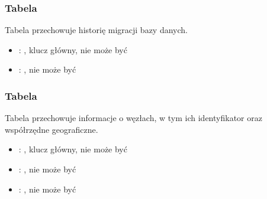 \subsubsection{Tabela }
Tabela przechowuje historię migracji bazy danych.
\begin{itemize}
    \item {}: , klucz główny, nie może być 
    \item {}: , nie może być 
\end{itemize}

\subsubsection{Tabela }
Tabela przechowuje informacje o węzłach, w tym ich identyfikator oraz współrzędne geograficzne.
\begin{itemize}
    \item {}: , klucz główny, nie może być 
    \item {}: , nie może być 
    \item {}: , nie może być 
\end{itemize}

